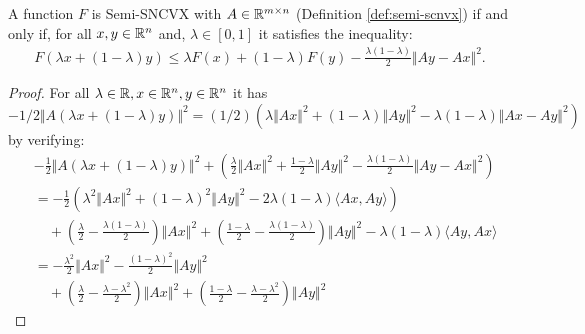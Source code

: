 \documentclass[12pt]{article}
\begin{document}
        \begin{theorem}\label{thm:semi-scnvx-equiv}
            A function $F$ is Semi-SNCVX with $A \in \mathbb R^{m \times n}$ (Definition \ref{def:semi-scnvx}) if and only if, for all $x, y \in \mathbb R^n$ and, $\lambda \in [0, 1]$ it satisfies the inequality: 
            \begin{align*}
                F(\lambda x + (1 - \lambda)y) \le \lambda F(x) + (1 - \lambda)F(y) -\frac{\lambda(1 - \lambda)}{2} \Vert Ay - Ax\Vert^2. 
            \end{align*}
        \end{theorem}
        \begin{proof}
            For all $\lambda \in \mathbb R, x \in \mathbb R^n, y \in \mathbb R^n$ it has $-1/2\Vert A(\lambda x + (1 - \lambda)y)\Vert^2 = (1/2)(\lambda\Vert Ax\Vert^2 + (1 - \lambda)\Vert Ay\Vert^2 - \lambda(1 - \lambda)\Vert Ax - Ay\Vert^2)$ by verifying: 
            \begin{align*}
                & -\frac{1}{2}\Vert A(\lambda x + (1 - \lambda)y)\Vert^2 + 
                \left(
                    \frac{\lambda}{2}\Vert Ax\Vert^2 + \frac{1 - \lambda}{2}\Vert Ay\Vert^2 - \frac{\lambda(1 - \lambda)}{2}\Vert Ay - Ax\Vert^2
                \right)
                \\
                &= 
                -\frac{1}{2}\left(
                    \lambda^2\Vert Ax\Vert^2 + (1 - \lambda)^2\Vert Ay\Vert^2 - 2\lambda(1 - \lambda) \langle Ax, Ay\rangle
                \right)
                    \\ &\quad 
                    + 
                    \left(
                        \frac{\lambda}{2} - \frac{\lambda(1 - \lambda)}{2}
                    \right)\Vert Ax\Vert^2 + \left(
                        \frac{1 - \lambda}{2} - \frac{\lambda(1 - \lambda)}{2}
                    \right)\Vert Ay\Vert^2 - \lambda(1 - \lambda)\langle Ay, Ax\rangle
                \\
                &= - \frac{\lambda^2}{2}\Vert Ax\Vert^2 - \frac{(1 - \lambda)^2}{2}\Vert Ay\Vert^2
                    \\ &\quad 
                    + 
                    \left(
                        \frac{\lambda}{2} - \frac{\lambda - \lambda^2}{2}
                    \right)\Vert Ax\Vert^2 + \left(
                        \frac{1 - \lambda}{2} - \frac{\lambda - \lambda^2}{2}
                    \right)\Vert Ay\Vert^2

\end{align*}
\end{proof}
\end{document}
